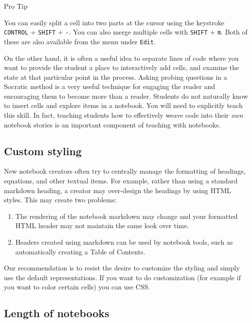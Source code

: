 \documentclass[]{book}
\begin{document}
Pro Tip

You can easily split a cell into two parts at the cursor using the
keystroke \texttt{CONTROL} + \texttt{SHIFT} + \texttt{-}. You can also
merge multiple cells with \texttt{SHIFT} + \texttt{m}. Both of these are
also available from the menu under \texttt{Edit}.

On the other hand, it is often a useful idea to separate lines of code
where you want to provide the student a place to interactively add
cells, and examine the state at that particular point in the process.
Asking probing questions in a Socratic method is a very useful technique
for engaging the reader and encouraging them to become more than a
reader. Students do not naturally know to insert cells and explore items
in a notebook. You will need to explicitly teach this skill. In fact,
teaching students how to effectively weave code into their \emph{own}
notebook stories is an important component of teaching with notebooks.

\subsection{Custom styling}\label{custom-styling}

New notebook creators often try to centrally manage the formatting of
headings, equations, and other textual items. For example, rather than
using a standard markdown heading, a creator may over-design the
headings by using HTML styles. This may create two problems:

\begin{enumerate}
\def\labelenumi{\arabic{enumi}.}
\item
  The rendering of the notebook markdown may change and your formatted
  HTML header may not maintain the same look over time.
\item
  Headers created using markdown can be used by notebook tools, such as
  automatically creating a Table of Contents.
\end{enumerate}

Our recommendation is to resist the desire to customize the styling and
simply use the default representations. If you want to do customization
(for example if you want to color certain cells) you can use CSS.

\subsection{Length of notebooks}\label{length-of-notebooks}
\end{document}
